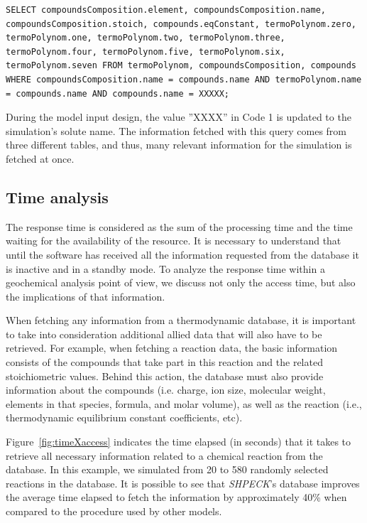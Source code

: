 \documentclass[preprint,12pt,3p]{elsarticle}
\begin{document}
\begin{minipage}{0.8\linewidth}
\begin{lstlisting}[frame=single, label=cod:sqlQuery, caption=\emph{SHPECK}'s \emph{SQLite} example query]
SELECT compoundsComposition.element, compoundsComposition.name, compoundsComposition.stoich, compounds.eqConstant, termoPolynom.zero, termoPolynom.one, termoPolynom.two, termoPolynom.three, termoPolynom.four, termoPolynom.five, termoPolynom.six, termoPolynom.seven FROM termoPolynom, compoundsComposition, compounds WHERE compoundsComposition.name = compounds.name AND termoPolynom.name = compounds.name AND compounds.name = XXXXX;
\end{lstlisting}
\end{minipage}

During the model input design, the value ”XXXX” in Code 1 is updated to the simulation’s solute name. The information fetched with this query comes from three different tables, and thus, many relevant information for the simulation is fetched at once.

\subsection{Time analysis}
The response time is considered as the sum of the processing time and the time waiting for the availability of the resource. It is necessary to understand that until the software has received all the information requested from the database it is inactive and in a standby mode. To analyze the response time within a geochemical analysis point of view, we discuss not only the access time, but also the implications of that information.

When fetching any information from a thermodynamic database, it is important to take into consideration additional allied data that will also have to be retrieved. For example, when fetching a reaction data, the basic information consists of the compounds that take part in this reaction and the related stoichiometric values. Behind this action, the database must also provide information about the compounds (i.e. charge, ion size, molecular weight, elements in that species, formula, and molar volume), as well as the reaction (i.e., thermodynamic equilibrium constant coefficients, etc).

Figure~\ref{fig:timeXaccess} indicates the time elapsed (in seconds) that it takes to retrieve all necessary information related to a chemical reaction from the database. In this example, we simulated from 20 to 580 randomly selected reactions in the database. It is possible to see that \emph{SHPECK}'s database improves the average time elapsed to fetch the information by approximately 40\% when compared to the procedure used by other models.
\end{document}
